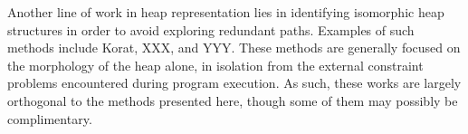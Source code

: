Another line of work in heap representation lies in identifying
isomorphic heap structures in order to avoid exploring redundant
paths. Examples of such methods include Korat, XXX, and YYY. These
methods are generally focused on the morphology of the heap alone, in
isolation from the external constraint problems encountered during
program execution. As such, these works are largely orthogonal to the
methods presented here, though some of them may possibly be
complimentary.
